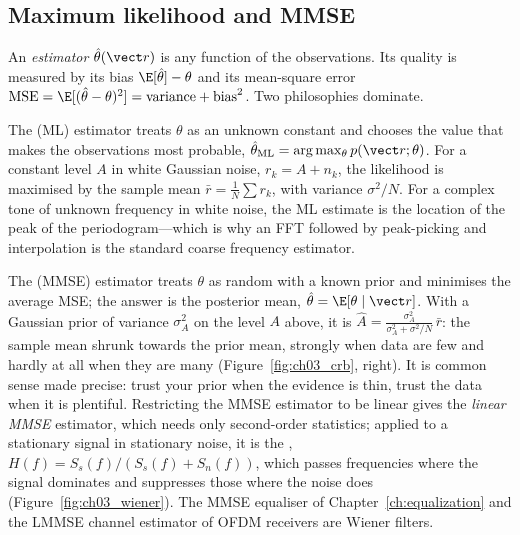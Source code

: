 \subsection{Maximum likelihood and MMSE}

An \emph{estimator} $\hat\theta(\vect r)$ is any function of the observations. Its quality is measured by
its bias $\E[\hat\theta]-\theta$ and its mean-square error
$\mathrm{MSE}=\E[(\hat\theta-\theta)^2]=\text{variance}+\text{bias}^2$. Two philosophies dominate.

The  (ML) estimator treats $\theta$ as an unknown constant and chooses the value
that makes the observations most probable, $\hat\theta_{\text{ML}}=\arg\max_\theta p(\vect r;\theta)$. For a
constant level $A$ in white Gaussian noise, $r_k=A+n_k$, the likelihood is maximised by the sample mean
$\bar r=\frac1N\sum r_k$, with variance $\sigma^2/N$. For a complex tone of unknown frequency in white noise,
the ML estimate is the location of the peak of the periodogram---which is why an FFT followed by
peak-picking and interpolation is the standard coarse frequency estimator.

The  (MMSE) estimator treats $\theta$ as random with a known prior and
minimises the average MSE; the answer is the posterior mean, $\hat\theta=\E[\theta\mid\vect r]$. With a
Gaussian prior of variance $\sigma_A^2$ on the level $A$ above, it is
$\hat A=\frac{\sigma_A^2}{\sigma_A^2+\sigma^2/N}\,\bar r$: the sample mean shrunk towards the prior mean,
strongly when data are few and hardly at all when they are many (Figure~\ref{fig:ch03_crb}, right). It is
common sense made precise: trust your prior when the evidence is thin, trust the data when it is plentiful.
Restricting the MMSE estimator to be linear gives the \emph{linear MMSE} estimator, which needs only
second-order statistics; applied to a stationary signal in stationary noise, it is the ,
$H(f)=S_s(f)/(S_s(f)+S_n(f))$, which passes frequencies where the signal dominates and suppresses those where
the noise does (Figure~\ref{fig:ch03_wiener}). The MMSE equaliser of Chapter~\ref{ch:equalization} and the
LMMSE channel estimator of OFDM receivers are Wiener filters.


